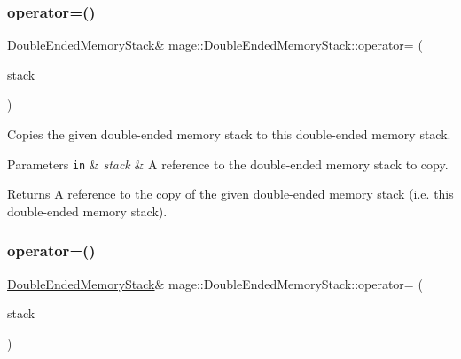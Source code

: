 \subsubsection{\texorpdfstring{operator=()}{operator=()}\hspace{0.1cm}{\footnotesize\ttfamily [1/2]}}
{\footnotesize\ttfamily \mbox{\hyperlink{classmage_1_1_double_ended_memory_stack}{Double\+Ended\+Memory\+Stack}}\& mage\+::\+Double\+Ended\+Memory\+Stack\+::operator= (\begin{DoxyParamCaption}\item[{const \mbox{\hyperlink{classmage_1_1_double_ended_memory_stack}{Double\+Ended\+Memory\+Stack}} \&}]{stack }\end{DoxyParamCaption})\hspace{0.3cm}{\ttfamily [delete]}}

Copies the given double-\/ended memory stack to this double-\/ended memory stack.


\begin{DoxyParams}[1]{Parameters}
\mbox{\tt in}  & {\em stack} & A reference to the double-\/ended memory stack to copy. \\
\hline
\end{DoxyParams}
\begin{DoxyReturn}{Returns}
A reference to the copy of the given double-\/ended memory stack (i.\+e. this double-\/ended memory stack). 
\end{DoxyReturn}
\mbox{\label{classmage_1_1_double_ended_memory_stack_a95b220925f1ef732c104901c3f55015d}} 
\subsubsection{\texorpdfstring{operator=()}{operator=()}\hspace{0.1cm}{\footnotesize\ttfamily [2/2]}}
{\footnotesize\ttfamily \mbox{\hyperlink{classmage_1_1_double_ended_memory_stack}{Double\+Ended\+Memory\+Stack}}\& mage\+::\+Double\+Ended\+Memory\+Stack\+::operator= (\begin{DoxyParamCaption}\item[{\mbox{\hyperlink{classmage_1_1_double_ended_memory_stack}{Double\+Ended\+Memory\+Stack}} \&\&}]{stack }\end{DoxyParamCaption})\hspace{0.3cm}{\ttfamily [delete]}}

